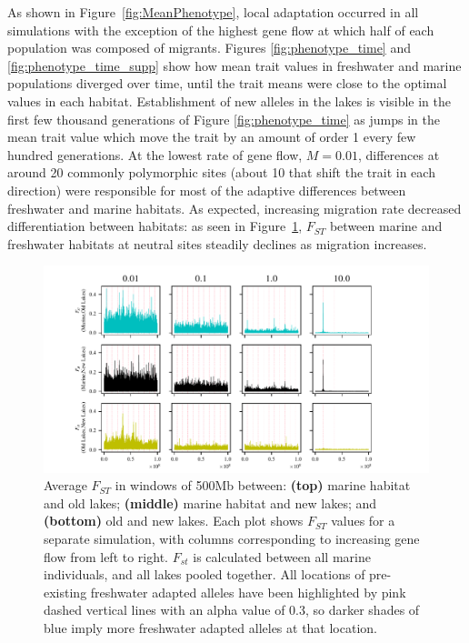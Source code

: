 \documentclass{article}
\begin{document}
As shown in Figure~\ref{fig:MeanPhenotype}, local adaptation occurred in all simulations
with the exception of the highest gene flow at which half of each population was composed of migrants.
Figures \ref{fig:phenotype_time} and \ref{fig:phenotype_time_supp}
show how mean trait values in freshwater and marine populations diverged over time,
until the trait means were close to the optimal values in each habitat. 
Establishment of new alleles in the lakes is visible 
in the first few thousand generations of Figure \ref{fig:phenotype_time} as jumps in the mean trait value
which move the trait by an amount of order 1 every few hundred generations.
At the lowest rate of gene flow, $M = 0.01$, differences at around 20 commonly polymorphic sites 
(about 10 that shift the trait in each direction)
were responsible for most of the adaptive differences between freshwater and marine habitats.
As expected, increasing migration rate decreased differentiation between habitats:
as seen in Figure~\ref{fig:Fst}, 
$F_{ST}$ between marine and freshwater habitats 
at neutral sites steadily declines as migration increases. 

\begin{figure}
    \begin{center}
        \includegraphics[width=\textwidth]{Final_Plots/Fst_Genome_faa_pos.pdf}
          \caption{
        Average $F_{ST}$ in windows of 500Mb between:
                \textbf{(top)} marine habitat and old lakes;
                \textbf{(middle)} marine habitat and new lakes; and
                \textbf{(bottom)} old and new lakes.
                Each plot shows $F_{ST}$ values for a separate simulation,
                with columns corresponding to increasing gene flow from left to right.
        $F_{st}$ is calculated between all marine individuals, and all lakes pooled together.
        All locations of pre-existing freshwater adapted alleles have been highlighted by 
        pink dashed vertical lines with an alpha value of 0.3, so darker shades of blue imply more 
        freshwater adapted alleles at that location.
     } \label{fig:Fst}
    \end{center}
\end{figure}
\end{document}
